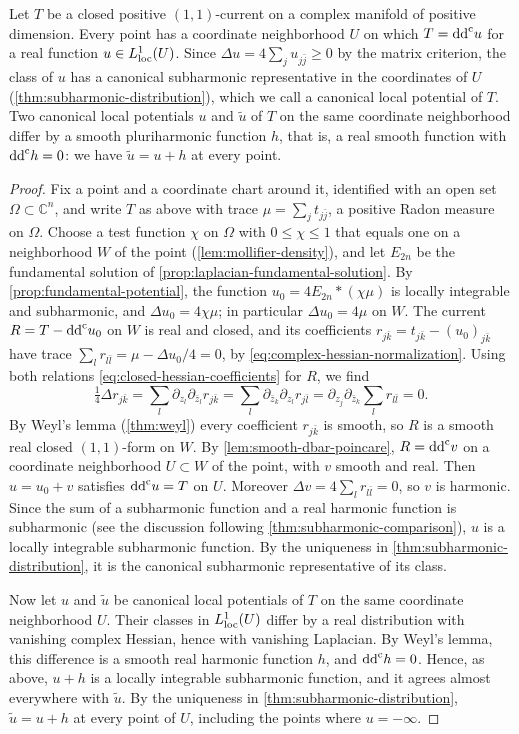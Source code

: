 \begin{theorem}\label{thm:local-positive-current-potential}
Let $T$ be a closed positive $(1,1)$-current on a complex manifold of positive dimension. Every point has a coordinate neighborhood $U$ on which $T=\mathrm{dd}^{\mathrm{c}} u$ for a real function $u\in L^1_{\mathrm{loc}}(U)$. Since $\Delta u=4\sum_ju_{j\bar j}\geq0$ by the matrix criterion, the class of $u$ has a canonical subharmonic representative in the coordinates of $U$ (\cref{thm:subharmonic-distribution}), which we call a canonical local potential of $T$. Two canonical local potentials $u$ and $\widetilde u$ of $T$ on the same coordinate neighborhood differ by a smooth pluriharmonic function $h$, that is, a real smooth function with $\mathrm{dd}^{\mathrm{c}} h=0$: we have $\widetilde u=u+h$ at every point.
\end{theorem}
\begin{proof}
Fix a point and a coordinate chart around it, identified with an open set $\Omega\subset\mathbb C^n$, and write $T$ as above with trace $\mu=\sum_jt_{j\bar j}$, a positive Radon measure on $\Omega$. Choose a test function $\chi$ on $\Omega$ with $0\leq\chi\leq1$ that equals one on a neighborhood $W$ of the point (\cref{lem:mollifier-density}), and let $E_{2n}$ be the fundamental solution of \cref{prop:laplacian-fundamental-solution}. By \cref{prop:fundamental-potential}, the function $u_0=4E_{2n}*(\chi\mu)$ is locally integrable and subharmonic, and $\Delta u_0=4\chi\mu$; in particular $\Delta u_0=4\mu$ on $W$. The current $R=T-\mathrm{dd}^{\mathrm{c}} u_0$ on $W$ is real and closed, and its coefficients $r_{j\bar k}=t_{j\bar k}-(u_0)_{j\bar k}$ have trace $\sum_lr_{l\bar l}=\mu-\Delta u_0/4=0$, by \eqref{eq:complex-hessian-normalization}. Using both relations \eqref{eq:closed-hessian-coefficients} for $R$, we find
\[
 \tfrac14\Delta r_{j\bar k}
 =\sum_l\partial_{z_l}\partial_{\bar z_l}r_{j\bar k}
 =\sum_l\partial_{\bar z_k}\partial_{z_l}r_{j\bar l}
 =\partial_{z_j}\partial_{\bar z_k}\sum_l r_{l\bar l}=0.
\]
By Weyl's lemma (\cref{thm:weyl}) every coefficient $r_{j\bar k}$ is smooth, so $R$ is a smooth real closed $(1,1)$-form on $W$. By \cref{lem:smooth-dbar-poincare}, $R=\mathrm{dd}^{\mathrm{c}} v$ on a coordinate neighborhood $U\subset W$ of the point, with $v$ smooth and real. Then $u=u_0+v$ satisfies $\mathrm{dd}^{\mathrm{c}} u=T$ on $U$. Moreover $\Delta v=4\sum_lr_{l\bar l}=0$, so $v$ is harmonic. Since the sum of a subharmonic function and a real harmonic function is subharmonic (see the discussion following \cref{thm:subharmonic-comparison}), $u$ is a locally integrable subharmonic function. By the uniqueness in \cref{thm:subharmonic-distribution}, it is the canonical subharmonic representative of its class.

Now let $u$ and $\widetilde u$ be canonical local potentials of $T$ on the same coordinate neighborhood $U$. Their classes in $L^1_{\mathrm{loc}}(U)$ differ by a real distribution with vanishing complex Hessian, hence with vanishing Laplacian. By Weyl's lemma, this difference is a smooth real harmonic function $h$, and $\mathrm{dd}^{\mathrm{c}} h=0$. Hence, as above, $u+h$ is a locally integrable subharmonic function, and it agrees almost everywhere with $\widetilde u$. By the uniqueness in \cref{thm:subharmonic-distribution}, $\widetilde u=u+h$ at every point of $U$, including the points where $u=-\infty$.
\end{proof}
